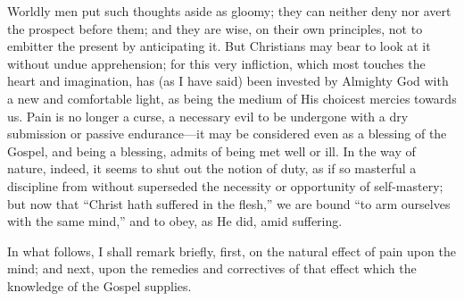 Worldly men put such thoughts aside as gloomy; they can neither
deny nor avert the prospect before them; and they are wise, on their
own principles, not to embitter the present by anticipating it. But
Christians may bear to look at it without undue apprehension; for this
very infliction, which most touches the heart and imagination, has (as
I have said) been invested by Almighty God with a new and comfortable
light, as being the medium of His choicest mercies towards us. Pain is
no longer a curse, a necessary evil to be undergone with a dry
submission or passive endurance—it may be considered even as a
blessing of the Gospel, and being a blessing, admits of being met well
or ill. In the way of nature, indeed, it seems to shut out the notion
of duty, as if so masterful a discipline from without superseded the
necessity or opportunity of self-mastery; but now that ``Christ
hath suffered in the flesh,'' we are bound ``to arm ourselves
with the same mind,'' and to obey, as He did, amid suffering.

In what follows, I shall remark briefly, first, on the natural
effect of pain upon the mind; and next, upon the remedies and
correctives of that effect which the knowledge of the Gospel supplies.

